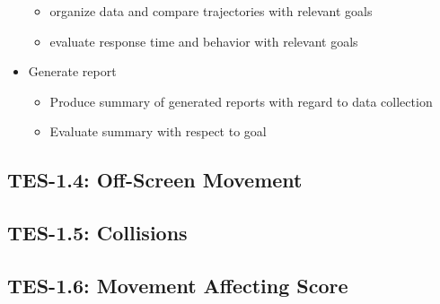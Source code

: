 \begin{itemize}
\begin{itemize}
\item organize data and compare trajectories with relevant goals 
\item evaluate response time and behavior with relevant goals 
\end{itemize}
\item Generate report 

\begin{itemize}
\item Produce summary of generated reports with regard to data collection 
\item Evaluate summary with respect to goal
\end{itemize}
\end{itemize}

\subsection{TES-1.4: Off-Screen Movement}

\subsection{TES-1.5: Collisions}

\subsection{TES-1.6: Movement Affecting Score}


